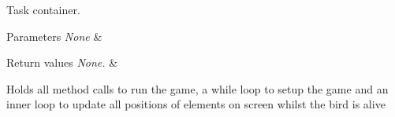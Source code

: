 Task container. 


\begin{DoxyParams}{Parameters}
{\em None} & \\
\hline
\end{DoxyParams}

\begin{DoxyRetVals}{Return values}
{\em None.} & \\
\hline
\end{DoxyRetVals}
Holds all method calls to run the game, a while loop to setup the game and an inner loop to update all positions of elements on screen whilst the bird is alive 